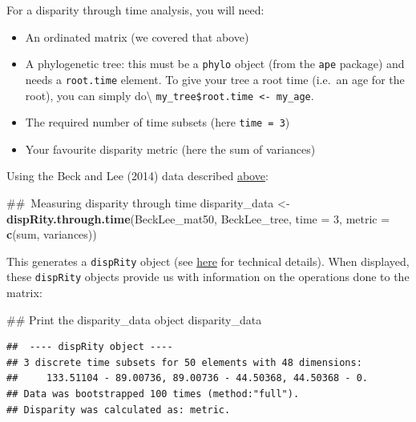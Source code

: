 \documentclass[]{book}
\newenvironment{Shaded}{\begin{snugshade}}{\end{snugshade}}
\newcommand{\KeywordTok}[1]{\textcolor[rgb]{0.13,0.29,0.53}{\textbf{#1}}}
\newcommand{\DataTypeTok}[1]{\textcolor[rgb]{0.13,0.29,0.53}{#1}}
\newcommand{\DecValTok}[1]{\textcolor[rgb]{0.00,0.00,0.81}{#1}}
\newcommand{\StringTok}[1]{\textcolor[rgb]{0.31,0.60,0.02}{#1}}
\newcommand{\NormalTok}[1]{#1}
\providecommand{\tightlist}{%
  \setlength{\itemsep}{0pt}\setlength{\parskip}{0pt}}
\theoremstyle{definition}
\theoremstyle{definition}
\theoremstyle{remark}
\begin{document}
For a disparity through time analysis, you will need:

\begin{itemize}
\tightlist
\item
  An ordinated matrix (we covered that above)
\item
  A phylogenetic tree: this must be a \texttt{phylo} object (from the
  \texttt{ape} package) and needs a \texttt{root.time} element. To give
  your tree a root time (i.e.~an age for the root), you can simply
  do\textbackslash{}
  \texttt{my\_tree\$root.time\ \textless{}-\ my\_age}.
\item
  The required number of time subsets (here \texttt{time\ =\ 3})
\item
  Your favourite disparity metric (here the sum of variances)
\end{itemize}

Using the Beck and Lee (2014) data described
\protect\hyperlink{example-data}{above}:

\begin{Shaded}
\begin{Highlighting}[]
\NormalTok{## Measuring disparity through time}
\NormalTok{disparity_data <-}\StringTok{ }\KeywordTok{dispRity.through.time}\NormalTok{(BeckLee_mat50, BeckLee_tree,}
                                        \DataTypeTok{time =} \DecValTok{3}\NormalTok{, }\DataTypeTok{metric =} \KeywordTok{c}\NormalTok{(sum, variances))}
\end{Highlighting}
\end{Shaded}

This generates a \texttt{dispRity} object (see
\protect\hyperlink{guts}{here} for technical details). When displayed,
these \texttt{dispRity} objects provide us with information on the
operations done to the matrix:

\begin{Shaded}
\begin{Highlighting}[]
\NormalTok{## Print the disparity_data object}
\NormalTok{disparity_data}
\end{Highlighting}
\end{Shaded}

\begin{verbatim}
##  ---- dispRity object ---- 
## 3 discrete time subsets for 50 elements with 48 dimensions:
##     133.51104 - 89.00736, 89.00736 - 44.50368, 44.50368 - 0.
## Data was bootstrapped 100 times (method:"full").
## Disparity was calculated as: metric.
\end{verbatim}
\end{document}
